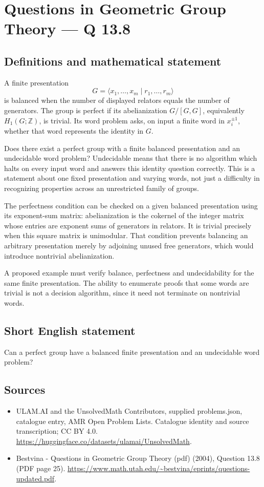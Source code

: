 \documentclass[11pt,a4paper]{article}
\begin{document}
\section*{Questions in Geometric Group Theory — Q 13.8}\label{statement}

\subsection{Definitions and mathematical statement}
A finite presentation
\[
 G=\langle x_1,\ldots,x_m\mid r_1,\ldots,r_m\rangle
\]
is balanced when the number of displayed relators equals the number of generators. The group is perfect if its abelianization $G/[G,G]$, equivalently $H_1(G;\mathbb Z)$, is trivial. Its word problem asks, on input a finite word in $x_i^{\pm1}$, whether that word represents the identity in $G$.

Does there exist a perfect group with a finite balanced presentation and an undecidable word problem? Undecidable means that there is no algorithm which halts on every input word and answers this identity question correctly. This is a statement about one fixed presentation and varying words, not just a difficulty in recognizing properties across an unrestricted family of groups.

The perfectness condition can be checked on a given balanced presentation using its exponent-sum matrix: abelianization is the cokernel of the integer matrix whose entries are exponent sums of generators in relators. It is trivial precisely when this square matrix is unimodular. That condition prevents balancing an arbitrary presentation merely by adjoining unused free generators, which would introduce nontrivial abelianization.

A proposed example must verify balance, perfectness and undecidability for the same finite presentation. The ability to enumerate proofs that some words are trivial is not a decision algorithm, since it need not terminate on nontrivial words.
\subsection{Short English statement}
Can a perfect group have a balanced finite presentation and an undecidable word problem?
\subsection{Sources}
\begin{itemize}
\item[S1] ULAM.AI and the UnsolvedMath Contributors, supplied problems.json, catalogue entry, AMR Open Problem Lists. Catalogue identity and source transcription; CC BY 4.0.
\url{https://huggingface.co/datasets/ulamai/UnsolvedMath}.
\item[S2] Bestvina - Questions in Geometric Group Theory (pdf) (2004), Question 13.8 (PDF page 25). 
\url{https://www.math.utah.edu/~bestvina/eprints/questions-updated.pdf}.
\end{itemize}
\end{document}
